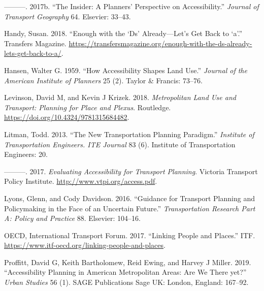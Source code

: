 \documentclass[12pt,]{article}
\begin{document}
\leavevmode\hypertarget{ref-boisjoly2017insider}{}%
---------. 2017b. ``The Insider: A Planners' Perspective on
Accessibility.'' \emph{Journal of Transport Geography} 64. Elsevier:
33--43.

\leavevmode\hypertarget{ref-handy2018enough}{}%
Handy, Susan. 2018. ``Enough with the `Ds' Already---Let's Get Back to
`a'.'' Transfers Magazine.
\url{https://transfersmagazine.org/enough-with-the-ds-already-lets-get-back-to-a/}.

\leavevmode\hypertarget{ref-hansen1959accessibility}{}%
Hansen, Walter G. 1959. ``How Accessibility Shapes Land Use.''
\emph{Journal of the American Institute of Planners} 25 (2). Taylor \&
Francis: 73--76.

\leavevmode\hypertarget{ref-levinson2018metropolitan}{}%
Levinson, David M, and Kevin J Krizek. 2018. \emph{Metropolitan Land Use
and Transport: Planning for Place and Plexus}. Routledge.
\url{https://doi.org/10.4324/9781315684482}.

\leavevmode\hypertarget{ref-litman2013new}{}%
Litman, Todd. 2013. ``The New Transportation Planning Paradigm.''
\emph{Institute of Transportation Engineers. ITE Journal} 83 (6).
Institute of Transportation Engineers: 20.

\leavevmode\hypertarget{ref-litman2017evaluating}{}%
---------. 2017. \emph{Evaluating Accessibility for Transport Planning}.
Victoria Transport Policy Institute.
\url{http://www.vtpi.org/access.pdf}.

\leavevmode\hypertarget{ref-lyons2016guidance}{}%
Lyons, Glenn, and Cody Davidson. 2016. ``Guidance for Transport Planning
and Policymaking in the Face of an Uncertain Future.''
\emph{Transportation Research Part A: Policy and Practice} 88. Elsevier:
104--16.

\leavevmode\hypertarget{ref-OECD2017linking}{}%
OECD, International Transport Forum. 2017. ``Linking People and
Places.'' ITF. \url{https://www.itf-oecd.org/linking-people-and-places}.

\leavevmode\hypertarget{ref-proffitt2019accessibility}{}%
Proffitt, David G, Keith Bartholomew, Reid Ewing, and Harvey J Miller.
2019. ``Accessibility Planning in American Metropolitan Areas: Are We
There yet?'' \emph{Urban Studies} 56 (1). SAGE Publications Sage UK:
London, England: 167--92.
\end{document}
